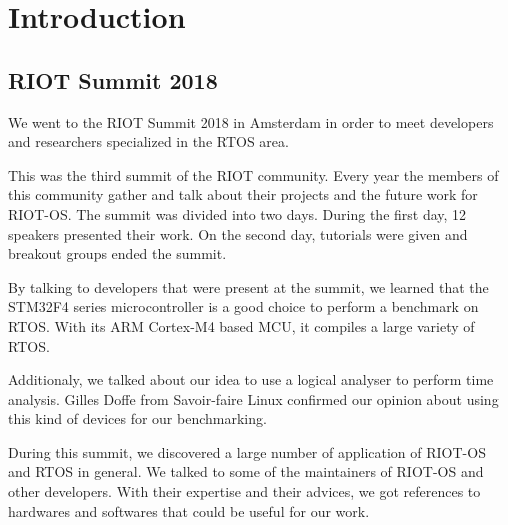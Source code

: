 \chapter*{Introduction}


\section*{RIOT Summit 2018}
We went to the RIOT Summit 2018 in Amsterdam in order to meet developers and researchers specialized in the RTOS area.

This was the third summit of the RIOT community.
Every year the members of this community gather and talk about their projects and the future work for RIOT-OS.
The summit was divided into two days. During the first day, 12 speakers presented their work. On the second day, tutorials were given and breakout groups ended the summit.

By talking to developers that were present at the summit, we learned that the STM32F4 series microcontroller is a good choice to perform a benchmark on RTOS. With its ARM Cortex-M4 based MCU, it compiles a large variety of RTOS.

Additionaly, we talked about our idea to use a logical analyser to perform time analysis. Gilles Doffe from Savoir-faire Linux confirmed our opinion about using this kind of devices for our benchmarking.

During this summit, we discovered a large number of application of RIOT-OS and RTOS in general.
We talked to some of the maintainers of RIOT-OS and other developers. With their expertise and their advices, we got references to hardwares and softwares that could be useful for our work.